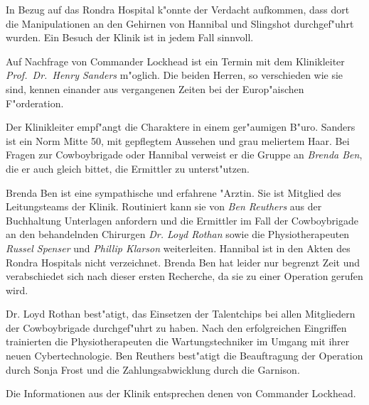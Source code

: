 
In Bezug auf das Rondra Hospital k"onnte der Verdacht aufkommen, dass dort die Manipulationen an den Gehirnen von Hannibal und Slingshot durchgef"uhrt wurden. Ein Besuch der Klinik ist in jedem Fall sinnvoll.

Auf Nachfrage von Commander Lockhead ist ein Termin mit dem Klinikleiter \emph{Prof.~Dr.~Henry Sanders} m"oglich. Die beiden Herren, so verschieden wie sie sind, kennen einander aus vergangenen Zeiten bei der Europ"aischen F"orderation.

Der Klinikleiter empf"angt die Charaktere in einem ger"aumigen B"uro. Sanders ist ein Norm Mitte 50, mit gepflegtem Aussehen und grau meliertem Haar. Bei Fragen zur Cowboybrigade oder Hannibal verweist er die Gruppe an \emph{Brenda Ben}, die er auch gleich bittet, die Ermittler zu unterst"utzen.

Brenda Ben ist eine sympathische und erfahrene "Arztin. Sie ist Mitglied des Leitungsteams der Klinik. Routiniert kann sie von \emph{Ben Reuthers} aus der Buchhaltung Unterlagen anfordern und die Ermittler im Fall der Cowboybrigade an den behandelnden Chirurgen \emph{Dr. Loyd Rothan} sowie die Physiotherapeuten \emph{Russel Spenser} und \emph{Phillip Klarson} weiterleiten. Hannibal ist in den Akten des Rondra Hospitals nicht verzeichnet. Brenda Ben hat leider nur begrenzt Zeit und verabschiedet sich nach dieser ersten Recherche, da sie zu einer Operation gerufen wird.

Dr. Loyd Rothan best"atigt, das Einsetzen der Talentchips bei allen Mitgliedern der Cowboybrigade durchgef"uhrt zu haben. Nach den erfolgreichen Eingriffen trainierten die Physiotherapeuten die Wartungstechniker im Umgang mit ihrer neuen Cybertechnologie. Ben Reuthers best"atigt die Beauftragung der Operation durch Sonja Frost und die Zahlungsabwicklung durch die Garnison.

Die Informationen aus der Klinik entsprechen denen von Commander Lockhead.

